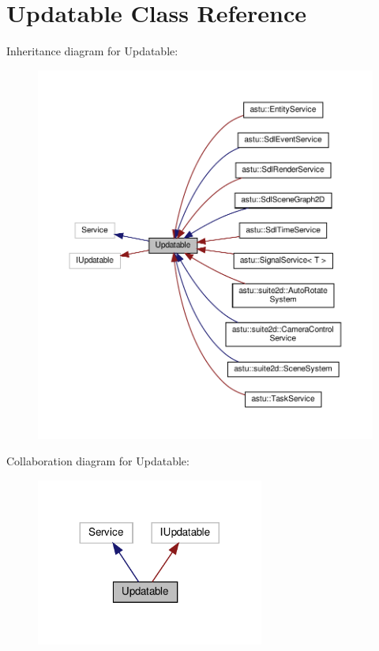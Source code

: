 \hypertarget{classUpdatable}{}\section{Updatable Class Reference}
\label{classUpdatable}


Inheritance diagram for Updatable\+:
\nopagebreak
\begin{figure}[H]
\begin{center}
\leavevmode
\includegraphics[width=350pt]{classUpdatable__inherit__graph}
\end{center}
\end{figure}


Collaboration diagram for Updatable\+:
\nopagebreak
\begin{figure}[H]
\begin{center}
\leavevmode
\includegraphics[width=212pt]{classUpdatable__coll__graph}
\end{center}
\end{figure}
